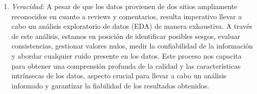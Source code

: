 \documentclass[12pt]{article}
\begin{document}
\begin{enumerate}
\begin{enumerate}
        \item \textit{Veracidad:} A pesar de que los datos provienen de dos sitios ampliamente reconocidos en cuanto a reviews y comentarios, resulta imperativo llevar a cabo un análisis exploratorio de datos (EDA) de manera exhaustiva. A través de este análisis, estamos en posición de identificar posibles sesgos, evaluar consistencias, gestionar valores nulos, medir la confiabilidad de la información y abordar cualquier ruido presente en los datos. Este proceso nos capacita para obtener una comprensión profunda de la calidad y las características intrínsecas de los datos, aspecto crucial para llevar a cabo un análisis informado y garantizar la fiabilidad de los resultados obtenidos.
    \end{enumerate}
\end{enumerate}
    


    
\end{document}
